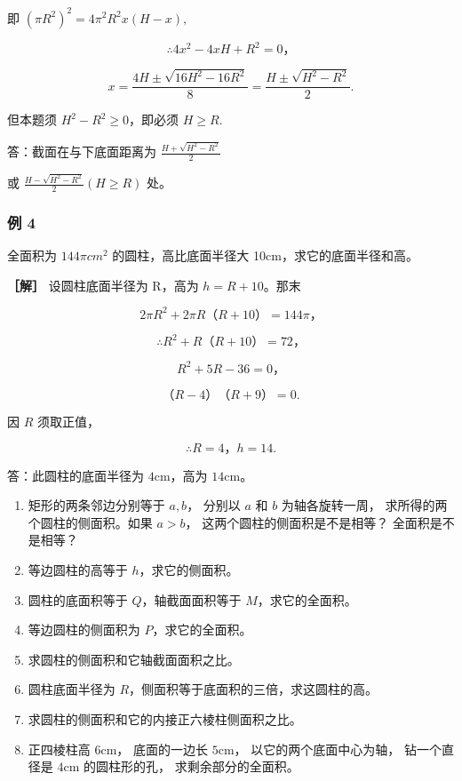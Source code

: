 即 \((\pi R^2)^2 = 4\pi^2 R^2 x(H - x),\)

\[
\therefore 4 x ^ {2} - 4 x H + R ^ {2} = 0\text{，}
\]

\[
x = \frac {4 H \pm \sqrt {16 H ^ {2} - 16 R ^ {2}}}{8} = \frac {H \pm \sqrt {H ^ {2} - R ^ {2}}}{2}.
\]

但本题须 \(H^2 - R^2 \geqslant 0\)，即必须 \(H \geqslant R\).

答：截面在与下底面距离为 \(\frac{H + \sqrt{H^2 - R^2}}{2}\)

或 \(\frac{H - \sqrt{H^2 - R^2}}{2} (H \geqslant R)\) 处。

\subsubsection{例 4}

全面积为 \(144\pi cm^{2}\) 的圆柱，高比底面半径大
10cm，求它的底面半径和高。

\textbf{［解］} 设圆柱底面半径为 R，高为 \(h = R + 10\)。那末

\[
2 \pi R ^ {2} + 2 \pi R \text{（}R + 10\text{）} = 144 \pi \text{，}
\]

\[
\therefore R ^ {2} + R \text{（}R + 10\text{）} = 72\text{，}
\]

\[
R ^ {2} + 5 R - 36 = 0\text{，}
\]

\[
\text{（}R - 4\text{）} \text{（}R + 9\text{）} = 0.
\]

因 \(R\) 须取正值，

\[
\therefore R = 4\text{，} h = 14.
\]

答：此圆柱的底面半径为 \(4\mathrm{cm}\)，高为 \(14\mathrm{cm}\)。

\begin{enumerate}
\item
  矩形的两条邻边分别等于 \(a, b\)， 分别以 \(a\) 和 \(b\)
  为轴各旋转一周， 求所得的两个圆柱的侧面积。如果 \(a > b\)，
  这两个圆柱的侧面积是不是相等？ 全面积是不是相等？
\item
  等边圆柱的高等于 \(h\)，求它的侧面积。
\item
  圆柱的底面积等于 \(Q\)，轴截面面积等于 \(M\)，求它的全面积。
\item
  等边圆柱的侧面积为 \(P\)，求它的全面积。
\item
  求圆柱的侧面积和它轴截面面积之比。
\item
  圆柱底面半径为 \(R\)，侧面积等于底面积的三倍，求这圆柱的高。
\item
  求圆柱的侧面积和它的内接正六棱柱侧面积之比。
\item
  正四棱柱高 \(6\mathrm{cm}\)， 底面的一边长 \(5\mathrm{cm}\)，
  以它的两个底面中心为轴， 钻一个直径是 \(4\mathrm{cm}\) 的圆柱形的孔，
  求剩余部分的全面积。
\end{enumerate}

